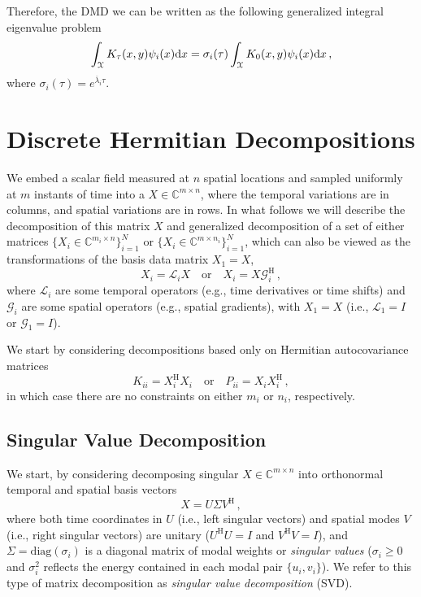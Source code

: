\documentclass[10pt]{article}
\begin{document}
Therefore, the DMD we can be written as the following generalized integral eigenvalue problem
\begin{equation}
	\int_{\cal X} K_\tau(x,y) \psi_i(x) \mathrm{d} x = \sigma_i(\tau)\int_{\cal X} K_0(x,y) \psi_i(x) \mathrm{d} x\,,
\end{equation}
where $\sigma_i(\tau) = e^{\overline \lambda_i\tau}$.

\section{Discrete Hermitian Decompositions}

We embed a scalar field measured at $n$ spatial locations and sampled uniformly at $m$ instants of time into a $X \in \mathbb{C}^{m\times n}$, where the temporal variations are in columns, and spatial variations are in rows.
In what follows we will describe the decomposition of this matrix $X$ and generalized decomposition of a set of either matrices $\{X_i\in\mathbb{C}^{m_i\times n}\}_{i=1}^N$ or $\{X_i\in\mathbb{C}^{m\times n_i}\}_{i=1}^N$, which can also be viewed as the transformations of the basis data matrix $X_1 = X$,
\begin{equation}
    X_i = \mathcal{L}_i X\quad \mathrm{or} \quad X_i = X \mathcal{G}_i^\mathrm{H}\,,
\end{equation}
where $\mathcal{L}_i$ are some temporal operators (e.g., time derivatives or time shifts) and $\mathcal{G}_i$ are some spatial operators (e.g., spatial gradients), with $X_1 = X$ (i.e., $\mathcal{L}_1 = I$ or $\mathcal{G}_1 = I$).

We start by considering decompositions based only on Hermitian autocovariance matrices
\begin{equation}
    K_{ii} = X_i^\mathrm{H} X_i \quad \mathrm{or} \quad P_{ii} = X_i X_i^\mathrm{H}\,,
\end{equation}
in which case there are no constraints on either $m_i$ or $n_i$, respectively.

\subsection{Singular Value Decomposition}

We start, by considering decomposing singular $X\in \mathbb{C}^{m\times n}$ into orthonormal temporal and spatial basis vectors
\begin{equation}\label{SVDX}
    X = U\Sigma V^\mathrm{H}\,,
\end{equation}
where both time coordinates in $U$ (i.e., left singular vectors) and spatial modes $V$ (i.e., right singular vectors) are unitary ($U^\mathrm{H} U = I$ and  $V^\mathrm{H} V = I$), and $\Sigma = \mathrm{diag}(\sigma_{i})$ is a diagonal matrix of modal weights or {\em singular values} ($\sigma_{i}\ge 0$ and $\sigma_{i}^2$ reflects the energy contained in each modal pair $\{u_i,v_i\}$).
We refer to this type of matrix decomposition as {\em singular value decomposition} (SVD).
\end{document}
